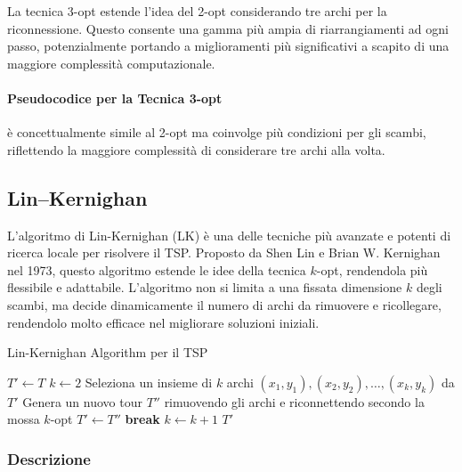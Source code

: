 La tecnica 3-opt estende l'idea del 2-opt considerando tre archi per la riconnessione. Questo consente una gamma più ampia di riarrangiamenti ad ogni passo, potenzialmente portando a miglioramenti più significativi a scapito di una maggiore complessità computazionale.

\paragraph{Pseudocodice per la Tecnica 3-opt} è concettualmente simile al 2-opt ma coinvolge più condizioni per gli scambi, riflettendo la maggiore complessità di considerare tre archi alla volta.

\subsection{Lin–Kernighan}

L'algoritmo di Lin-Kernighan (\gls{LK}) è una delle tecniche più avanzate e potenti di ricerca locale per risolvere il \gls{TSP}. Proposto da Shen Lin e Brian W. Kernighan nel 1973, questo algoritmo estende le idee della tecnica \(k\)-opt, rendendola più flessibile e adattabile. L'algoritmo non si limita a una fissata dimensione \(k\) degli scambi, ma decide dinamicamente il numero di archi da rimuovere e ricollegare, rendendolo molto efficace nel migliorare soluzioni iniziali.\cite{lin1973effective}


\begin{algorithm}
	\caption{Lin-Kernighan Algorithm per il \gls{TSP}}\label{alg:lin-kernighan}
	\begin{algorithmic}[1]
		 
		\State $T' \gets T$ 
		\Repeat
		\State $k \gets 2$
		\Repeat
		\State Seleziona un insieme di $k$ archi $(x_1, y_1), (x_2, y_2), \ldots, (x_k, y_k)$ da $T'$
		\State Genera un nuovo tour $T''$ rimuovendo gli archi e riconnettendo secondo la mossa $k$-opt
		\State $T' \gets T''$
		\State \textbf{break} 
		\EndIf
		\State $k \gets k + 1$
		\EndFor
		\State \Return $T'$
		\EndProcedure
	\end{algorithmic}
\end{algorithm}
\subsubsection{Descrizione}

